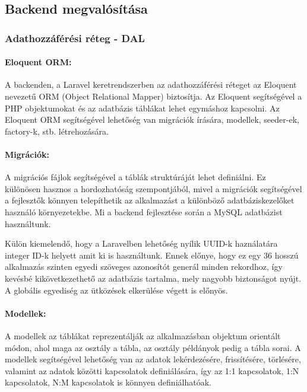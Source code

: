 \subsection{Backend megvalósítása}

\subsubsection{Adathozzáférési réteg - DAL}

\paragraph{Eloquent ORM:}
A backenden, a Laravel keretrendszerben az adathozzáférési réteget az Eloquent nevezetű ORM (Object Relational Mapper) biztosítja. Az Eloquent segítségével a PHP objektumokat és az adatbázis táblákat lehet egymáshoz kapcsolni. Az Eloquent ORM segítségével lehetőség van migrációk írására, modellek, seeder-ek, factory-k, stb. létrehozására.

\paragraph{Migrációk:}
A migrációs fájlok segítségével a táblák struktúráját lehet definiálni. Ez különösen hasznos a hordozhatóság szempontjából, mivel a migrációk segítségével a fejlesztők könnyen telepíthetik az alkalmazást a különböző adatbáziskezelőket használó környezetekbe. Mi a backend fejlesztése során a MySQL adatbázist használtunk.

Külön kiemelendő, hogy a Laravelben lehetőség nyílik UUID-k haználatára integer ID-k helyett amit ki is használtunk. Ennek előnye, hogy ez egy 36 hosszú alkalmazás szinten egyedi szöveges azonosítót generál minden rekordhoz, így kevésbé kikövetkezethető az adatbázis tartalma, mely nagyobb biztonságot nyújt. A globális egyediség az ütközések elkerülése végett is előnyös. 

\paragraph{Modellek:}
A modellek az táblákat reprezentálják az alkalmazásban objektum orientált módon, ahol maga az osztály a tábla, az osztály példányok pedig a tábla sorai. A modellek segítségével lehetőség van az adatok lekérdezésére, frissítésére, törlésére, valamint az adatok közötti kapcsolatok definiálására, így az 1:1 kapcsolatok, 1:N kapcsolatok, N:M kapcsolatok is könnyen definiálhatóak.

